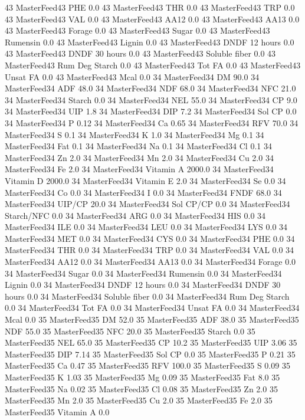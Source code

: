 \documentclass[letterpaper,10pt,english]{sphinxmanual}
\begin{document}
\begin{sphinxVerbatim}[commandchars=\\\{\},numbers=left,firstnumber=1,stepnumber=1]
43 MasterFeed43 PHE 0.0
43 MasterFeed43 THR 0.0
43 MasterFeed43 TRP 0.0
43 MasterFeed43 VAL 0.0
43 MasterFeed43 AA\PYGZsh{}12 0.0
43 MasterFeed43 AA\PYGZsh{}13 0.0
43 MasterFeed43 \PYGZpc{} Forage 0.0
43 MasterFeed43 Sugar \PYGZpc{} 0.0
43 MasterFeed43 Rumensin 0.0
43 MasterFeed43 Lignin 0.0
43 MasterFeed43 DNDF 12 hours 0.0
43 MasterFeed43 DNDF 30 hours 0.0
43 MasterFeed43 Soluble fiber 0.0
43 MasterFeed43 Rum Deg Starch 0.0
43 MasterFeed43 Tot FA 0.0
43 MasterFeed43 Unsat FA 0.0
43 MasterFeed43 Mcal 0.0
34 MasterFeed34 DM 90.0
34 MasterFeed34 ADF 48.0
34 MasterFeed34 NDF 68.0
34 MasterFeed34 NFC 21.0
34 MasterFeed34 Starch 0.0
34 MasterFeed34 NEL 55.0
34 MasterFeed34 CP 9.0
34 MasterFeed34 UIP 1.8
34 MasterFeed34 DIP 7.2
34 MasterFeed34 Sol CP 0.0
34 MasterFeed34 P 0.12
34 MasterFeed34 Ca 0.65
34 MasterFeed34 RFV 70.0
34 MasterFeed34 S 0.1
34 MasterFeed34 K 1.0
34 MasterFeed34 Mg 0.1
34 MasterFeed34 Fat 0.1
34 MasterFeed34 Na 0.1
34 MasterFeed34 Cl 0.1
34 MasterFeed34 Zn 2.0
34 MasterFeed34 Mn 2.0
34 MasterFeed34 Cu 2.0
34 MasterFeed34 Fe 2.0
34 MasterFeed34 Vitamin A 2000.0
34 MasterFeed34 Vitamin D 2000.0
34 MasterFeed34 Vitamin E 2.0
34 MasterFeed34 Se 0.0
34 MasterFeed34 Co 0.0
34 MasterFeed34 I 0.0
34 MasterFeed34 FNDF 68.0
34 MasterFeed34 UIP/CP 20.0
34 MasterFeed34 Sol CP/CP 0.0
34 MasterFeed34 Starch/NFC 0.0
34 MasterFeed34 ARG 0.0
34 MasterFeed34 HIS 0.0
34 MasterFeed34 ILE 0.0
34 MasterFeed34 LEU 0.0
34 MasterFeed34 LYS 0.0
34 MasterFeed34 MET 0.0
34 MasterFeed34 CYS 0.0
34 MasterFeed34 PHE 0.0
34 MasterFeed34 THR 0.0
34 MasterFeed34 TRP 0.0
34 MasterFeed34 VAL 0.0
34 MasterFeed34 AA\PYGZsh{}12 0.0
34 MasterFeed34 AA\PYGZsh{}13 0.0
34 MasterFeed34 \PYGZpc{} Forage 0.0
34 MasterFeed34 Sugar \PYGZpc{} 0.0
34 MasterFeed34 Rumensin 0.0
34 MasterFeed34 Lignin 0.0
34 MasterFeed34 DNDF 12 hours 0.0
34 MasterFeed34 DNDF 30 hours 0.0
34 MasterFeed34 Soluble fiber 0.0
34 MasterFeed34 Rum Deg Starch 0.0
34 MasterFeed34 Tot FA 0.0
34 MasterFeed34 Unsat FA 0.0
34 MasterFeed34 Mcal 0.0
35 MasterFeed35 DM 52.0
35 MasterFeed35 ADF 38.0
35 MasterFeed35 NDF 55.0
35 MasterFeed35 NFC 20.0
35 MasterFeed35 Starch 0.0
35 MasterFeed35 NEL 65.0
35 MasterFeed35 CP 10.2
35 MasterFeed35 UIP 3.06
35 MasterFeed35 DIP 7.14
35 MasterFeed35 Sol CP 0.0
35 MasterFeed35 P 0.21
35 MasterFeed35 Ca 0.47
35 MasterFeed35 RFV 100.0
35 MasterFeed35 S 0.09
35 MasterFeed35 K 1.03
35 MasterFeed35 Mg 0.09
35 MasterFeed35 Fat 8.0
35 MasterFeed35 Na 0.02
35 MasterFeed35 Cl 0.08
35 MasterFeed35 Zn 2.0
35 MasterFeed35 Mn 2.0
35 MasterFeed35 Cu 2.0
35 MasterFeed35 Fe 2.0
35 MasterFeed35 Vitamin A 0.0

\end{sphinxVerbatim}
\end{document}
